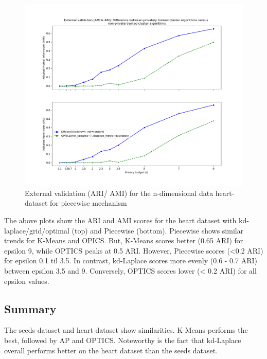 \begin{figure}[H]
\begin{minipage}[c]{0.60\textwidth}
        \includegraphics[width=1\textwidth]{Results/nd-piecewise/heart-dataset/ami-and-ari.png}
        \caption{External validation (ARI/ AMI) for the n-dimensional data heart-dataset for piecewise mechanism}
        \label{fig:external-validation-heart-dataset_comparison_nd-piecewise}
    \end{minipage}
\end{figure}
The above plots show the ARI and AMI scores for the heart dataset with kd-laplace/grid/optimal (top) and Piecewise (bottom).
Piecewise shows similar trends for K-Means and OPICS. But, K-Means scores better (0.65 ARI) for epsilon 9, while OPTICS peaks at 0.5 ARI.
However, Piecewise scores (<0.2 ARI) for epsilon 0.1 til 3.5.
In contrast, kd-Laplace scores more evenly (0.6 - 0.7 ARI) between epsilon 3.5 and 9. Conversely, OPTICS scores lower (< 0.2 ARI) for all epsilon values.

\subsection{Summary}
The seeds-dataset and heart-dataset show similarities.
K-Means performs the best, followed by AP and OPTICS.
Noteworthy is the fact that kd-Laplace overall performs better on the heart dataset than the seeds dataset.
\newpage
